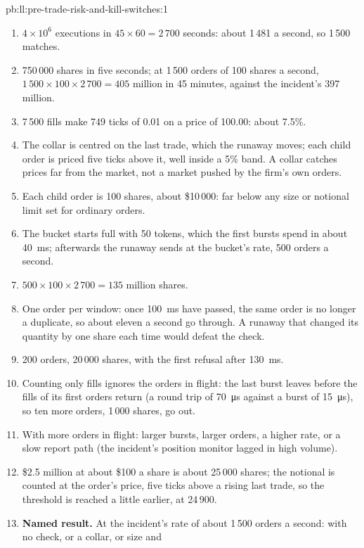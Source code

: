 \begin{solution}{pb:ll:pre-trade-risk-and-kill-switches:1}
\begin{enumerate}
\item $4 \times 10^6$ executions in $45 \times 60 = 2\,700$ seconds: about 1\,481 a second, so 1\,500 matches.
\item 750\,000 shares in five seconds; at 1\,500 orders of 100 shares a second, $1\,500 \times 100 \times 2\,700 = 405$ million
in 45 minutes, against the incident's 397 million.
\item 7\,500 fills make 749 ticks of 0.01 on a price of 100.00: about 7.5\%.
\item The collar is centred on the last trade, which the runaway moves; each child order is priced five ticks above it, well
inside a 5\% band. A collar catches prices far from the market, not a market pushed by the firm's own orders.
\item Each child order is 100 shares, about \$10\,000: far below any size or notional limit set for ordinary orders.
\item The bucket starts full with 50 tokens, which the first bursts spend in about \qty{40}{\milli\second}; afterwards the
runaway sends at the bucket's rate, 500 orders a second.
\item $500 \times 100 \times 2\,700 = 135$ million shares.
\item One order per window: once \qty{100}{\milli\second} have passed, the same order is no longer a duplicate, so about eleven
a second go through. A runaway that changed its quantity by one share each time would defeat the check.
\item 200 orders, 20\,000 shares, with the first refusal after \qty{130}{\milli\second}.
\item Counting only fills ignores the orders in flight: the last burst leaves before the fills of its first orders return (a
round trip of \qty{70}{\micro\second} against a burst of \qty{15}{\micro\second}), so ten more orders, 1\,000 shares, go out.
\item With more orders in flight: larger bursts, larger orders, a higher rate, or a slow report path (the incident's position
monitor lagged in high volume).
\item \$2.5 million at about \$100 a share is about 25\,000 shares; the notional is counted at the order's price, five ticks
above a rising last trade, so the threshold is reached a little earlier, at 24\,900.
\item \textbf{Named result.} At the incident's rate of about 1\,500 orders a second: with no check, or a collar, or size and

\end{enumerate}
\end{solution}
